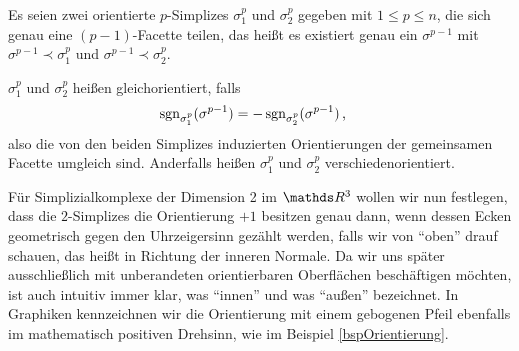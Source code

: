     \begin{definition}
      Es seien zwei orientierte \( p \)-Simplizes \( \sigma^{p}_{1} \) und \( \sigma^{p}_{2} \) gegeben mit \( 1 \le p \le n \), 
      die sich genau eine \( (p-1) \)-Facette teilen, das heißt es existiert genau ein \( \sigma^{p-1} \) mit 
      \( \sigma^{p-1} \prec \sigma^{p}_{1} \) und \( \sigma^{p-1} \prec \sigma^{p}_{2} \).

      \( \sigma^{p}_{1} \) und \( \sigma^{p}_{2} \) heißen gleichorientiert, falls
      \begin{align}
        \mathop{\mathrm{sgn}}\nolimits_{\sigma^{p}_{1}}(\sigma^{p-1}) &= - \mathop{\mathrm{sgn}}\nolimits_{\sigma^{p}_{2}}(\sigma^{p-1}) \,\text{,}
      \end{align}
      also die von den beiden Simplizes induzierten Orientierungen der gemeinsamen Facette umgleich sind.
      Anderfalls heißen \( \sigma^{p}_{1} \) und \( \sigma^{p}_{2} \) verschiedenorientiert.
    \end{definition}

    \begin{bemerkung}
      Für Simplizialkomplexe der Dimension 2 im \( \R^{3} \) wollen wir nun festlegen, dass die \( 2 \)-Simplizes die Orientierung \( +1 \)
      besitzen genau dann, wenn dessen Ecken geometrisch gegen den Uhrzeigersinn gezählt werden, falls wir von "`oben"' drauf schauen,
      das heißt in Richtung der inneren Normale.
      Da wir uns später ausschließlich mit unberandeten orientierbaren Oberflächen beschäftigen möchten, ist auch intuitiv immer klar, was "`innen"' und
      was "`außen"' bezeichnet.
      In Graphiken kennzeichnen wir die Orientierung mit einem gebogenen Pfeil ebenfalls im mathematisch positiven Drehsinn, wie im Beispiel
      \ref{bspOrientierung}.
    \end{bemerkung}

